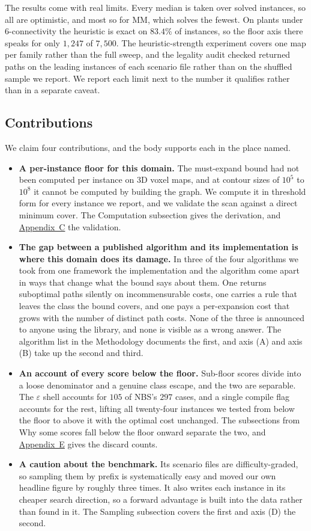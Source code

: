 \documentclass[letterpaper]{article} %
\begin{document}
The results come with real limits. Every median is taken over solved instances, so all are optimistic, and most so for MM, which solves the fewest. On plants under 6-connectivity the heuristic is exact on $83.4\%$ of instances, so the floor axis there speaks for only $1{,}247$ of $7{,}500$. The heuristic-strength experiment covers one map per family rather than the full sweep, and the legality audit checked returned paths on the leading instances of each scenario file rather than on the shuffled sample we report. We report each limit next to the number it qualifies rather than in a separate caveat.

\subsection{Contributions}
We claim four contributions, and the body supports each in the place named.
\begin{itemize}
  \item \textbf{A per-instance floor for this domain.} The must-expand bound had not been computed per instance on 3D voxel maps, and at contour sizes of $10^5$ to $10^8$ it cannot be computed by building the graph. We compute it in threshold form for every instance we report, and we validate the scan against a direct minimum cover. The Computation subsection gives the derivation, and \hyperref[app:c]{Appendix~C} the validation.
  \item \textbf{The gap between a published algorithm and its implementation is where this domain does its damage.} In three of the four algorithms we took from one framework the implementation and the algorithm come apart in ways that change what the bound says about them. One returns suboptimal paths silently on incommensurable costs, one carries a rule that leaves the class the bound covers, and one pays a per-expansion cost that grows with the number of distinct path costs. None of the three is announced to anyone using the library, and none is visible as a wrong answer. The algorithm list in the Methodology documents the first, and axis (A) and axis (B) take up the second and third.
  \item \textbf{An account of every score below the floor.} Sub-floor scores divide into a loose denominator and a genuine class escape, and the two are separable. The $\varepsilon$ shell accounts for $105$ of NBS's $297$ cases, and a single compile flag accounts for the rest, lifting all twenty-four instances we tested from below the floor to above it with the optimal cost unchanged. The subsections from Why some scores fall below the floor onward separate the two, and \hyperref[app:e]{Appendix~E} gives the discard counts.
  \item \textbf{A caution about the benchmark.} Its scenario files are difficulty-graded, so sampling them by prefix is systematically easy and moved our own headline figure by roughly three times. It also writes each instance in its cheaper search direction, so a forward advantage is built into the data rather than found in it. The Sampling subsection covers the first and axis (D) the second.
\end{itemize}
\end{document}
